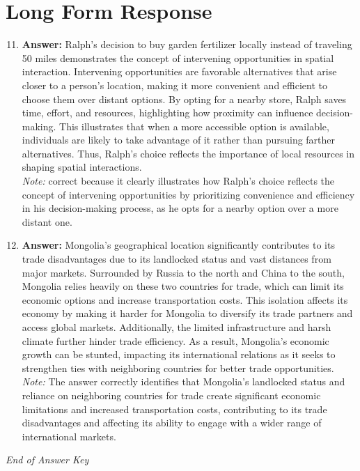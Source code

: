 \documentclass[12pt]{article}
\begin{document}
\section*{Long Form Response}
\begin{enumerate}[label=\arabic*.]
\setcounter{enumi}{10}
\item \textbf{Answer:} Ralph's decision to buy garden fertilizer locally instead of traveling 50 miles demonstrates the concept of intervening opportunities in spatial interaction. Intervening opportunities are favorable alternatives that arise closer to a person's location, making it more convenient and efficient to choose them over distant options. By opting for a nearby store, Ralph saves time, effort, and resources, highlighting how proximity can influence decision-making. This illustrates that when a more accessible option is available, individuals are likely to take advantage of it rather than pursuing farther alternatives. Thus, Ralph's choice reflects the importance of local resources in shaping spatial interactions.
\\ \textit{Note:} correct because it clearly illustrates how Ralph's choice reflects the concept of intervening opportunities by prioritizing convenience and efficiency in his decision-making process, as he opts for a nearby option over a more distant one.
\item \textbf{Answer:} Mongolia's geographical location significantly contributes to its trade disadvantages due to its landlocked status and vast distances from major markets. Surrounded by Russia to the north and China to the south, Mongolia relies heavily on these two countries for trade, which can limit its economic options and increase transportation costs. This isolation affects its economy by making it harder for Mongolia to diversify its trade partners and access global markets. Additionally, the limited infrastructure and harsh climate further hinder trade efficiency. As a result, Mongolia's economic growth can be stunted, impacting its international relations as it seeks to strengthen ties with neighboring countries for better trade opportunities.
\\ \textit{Note:} The answer correctly identifies that Mongolia's landlocked status and reliance on neighboring countries for trade create significant economic limitations and increased transportation costs, contributing to its trade disadvantages and affecting its ability to engage with a wider range of international markets.
\end{enumerate}

\vfill
\noindent\textit{End of Answer Key}
\end{document}
